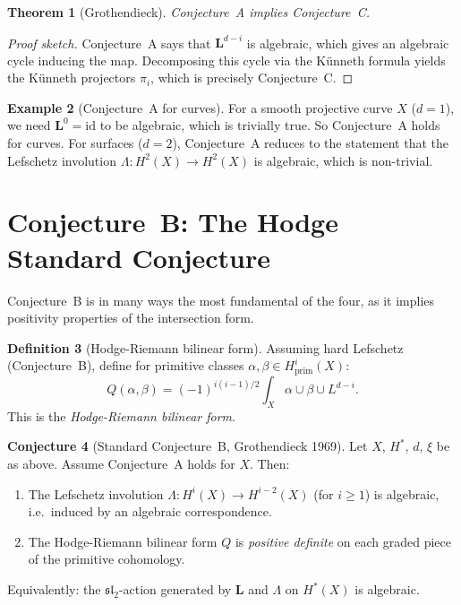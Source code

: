 \documentclass[12pt,a4paper]{amsart}
\newtheorem{theorem}{Theorem}[section]
\theoremstyle{definition}
\newtheorem{definition}[theorem]{Definition}
\newtheorem{example}[theorem]{Example}
\newtheorem{conjecture}[theorem]{Conjecture}
\newcommand{\id}{\mathrm{id}}
\begin{document}
\begin{theorem}[Grothendieck]\label{thm:A_implies_C}
Conjecture~A implies Conjecture~C.
\end{theorem}

\begin{proof}[Proof sketch]
Conjecture~A says that $\mathbf{L}^{d-i}$ is algebraic, which gives an
algebraic cycle inducing the map.  Decomposing this cycle via the K\"unneth
formula yields the K\"unneth projectors $\pi_i$, which is precisely
Conjecture~C.
\end{proof}

\begin{example}[Conjecture~A for curves]
For a smooth projective curve $X$ ($d=1$), we need $\mathbf{L}^0 = \id$ to
be algebraic, which is trivially true.  So Conjecture~A holds for curves.
For surfaces ($d=2$), Conjecture~A reduces to the statement that the
Lefschetz involution $\Lambda: H^2(X) \to H^2(X)$ is algebraic, which is
non-trivial.
\end{example}

\section{Conjecture~B: The Hodge Standard Conjecture}\label{sec:conjB}

Conjecture~B is in many ways the most fundamental of the four, as it implies
positivity properties of the intersection form.

\begin{definition}[Hodge-Riemann bilinear form]
Assuming hard Lefschetz (Conjecture~B), define for primitive classes
$\alpha, \beta \in H^i_{\mathrm{prim}}(X)$:
\[
  Q(\alpha, \beta) = (-1)^{i(i-1)/2} \int_X \alpha \cup \beta \cup L^{d-i}.
\]
This is the \emph{Hodge-Riemann bilinear form}.
\end{definition}

\begin{conjecture}[Standard Conjecture~B, Grothendieck 1969]\label{conj:B}
Let $X$, $H^*$, $d$, $\xi$ be as above.  Assume Conjecture~A holds for $X$.
Then:
\begin{enumerate}[label=(\roman*)]
  \item The Lefschetz involution $\Lambda: H^i(X) \to H^{i-2}(X)$ (for $i \geq 1$)
        is algebraic, i.e.\ induced by an algebraic correspondence.
  \item The Hodge-Riemann bilinear form $Q$ is \emph{positive definite} on
        each graded piece of the primitive cohomology.
\end{enumerate}
Equivalently: the $\mathfrak{sl}_2$-action generated by $\mathbf{L}$ and $\Lambda$
on $H^*(X)$ is algebraic.
\end{conjecture}
\end{document}
